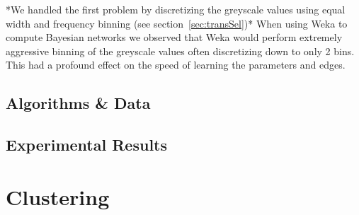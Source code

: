 \documentclass[11pt]{article}
\begin{document}
*We handled the first problem by discretizing the greyscale values using equal width and frequency binning (see section~\ref{sec:transSel})*
When using Weka to compute Bayesian networks we observed that Weka would perform extremely aggressive binning of the greyscale values often discretizing down to only 2 bins. This had a profound effect on the speed of learning the parameters and edges.

\subsection{Algorithms \& Data}


\subsection{Experimental Results}


\pagebreak

\section{Clustering}
\end{document}
